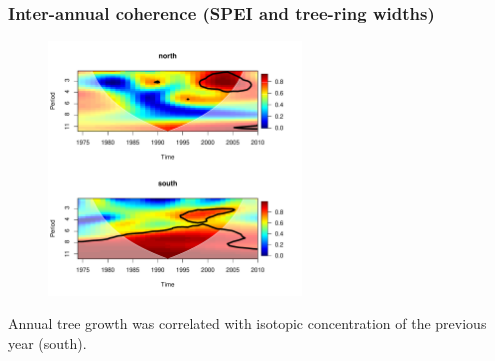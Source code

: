 \documentclass{beamer}
\begin{document}
\begin{frame}
\frametitle{Inter-annual coherence (SPEI and tree-ring widths)}
\begin{figure}
\includegraphics[width = 0.6\textwidth]{coherence1}
\end{figure}
Annual tree growth was correlated with isotopic concentration of the
previous year (south).
\end{frame}
\end{document}
